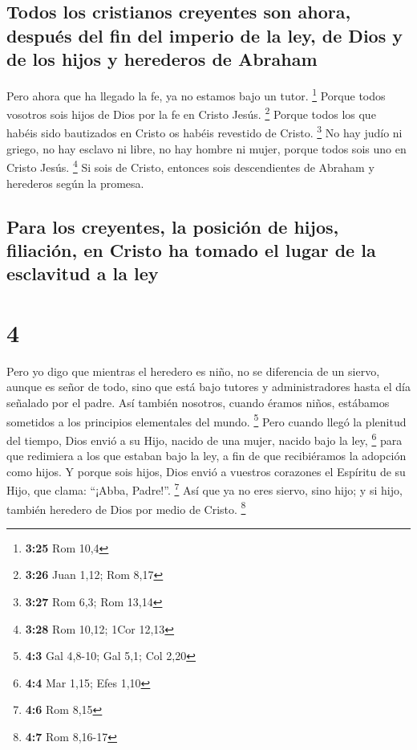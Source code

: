 \hypertarget{todos-los-cristianos-creyentes-son-ahora-despuuxe9s-del-fin-del-imperio-de-la-ley-de-dios-y-de-los-hijos-y-herederos-de-abraham}{%
\subsection{Todos los cristianos creyentes son ahora, después del fin
del imperio de la ley, de Dios y de los hijos y herederos de
Abraham}\label{todos-los-cristianos-creyentes-son-ahora-despuuxe9s-del-fin-del-imperio-de-la-ley-de-dios-y-de-los-hijos-y-herederos-de-abraham}}

 Pero ahora que ha llegado la fe, ya no estamos bajo un
tutor. \footnote{\textbf{3:25} Rom 10,4}  Porque todos
vosotros sois hijos de Dios por la fe en Cristo Jesús. \footnote{\textbf{3:26}
  Juan 1,12; Rom 8,17}  Porque todos los que habéis sido
bautizados en Cristo os habéis revestido de Cristo. \footnote{\textbf{3:27}
  Rom 6,3; Rom 13,14}  No hay judío ni griego, no hay
esclavo ni libre, no hay hombre ni mujer, porque todos sois uno en
Cristo Jesús. \footnote{\textbf{3:28} Rom 10,12; 1Cor 12,13}
 Si sois de Cristo, entonces sois descendientes de
Abraham y herederos según la promesa.

\hypertarget{para-los-creyentes-la-posiciuxf3n-de-hijos-filiaciuxf3n-en-cristo-ha-tomado-el-lugar-de-la-esclavitud-a-la-ley}{%
\subsection{Para los creyentes, la posición de hijos, filiación, en
Cristo ha tomado el lugar de la esclavitud a la
ley}\label{para-los-creyentes-la-posiciuxf3n-de-hijos-filiaciuxf3n-en-cristo-ha-tomado-el-lugar-de-la-esclavitud-a-la-ley}}

\hypertarget{section-3}{%
\section{4}\label{section-3}}

 Pero yo digo que mientras el heredero es niño, no se
diferencia de un siervo, aunque es señor de todo,  sino
que está bajo tutores y administradores hasta el día señalado por el
padre.  Así también nosotros, cuando éramos niños,
estábamos sometidos a los principios elementales del mundo. \footnote{\textbf{4:3}
  Gal 4,8-10; Gal 5,1; Col 2,20}  Pero cuando llegó la
plenitud del tiempo, Dios envió a su Hijo, nacido de una mujer, nacido
bajo la ley, \footnote{\textbf{4:4} Mar 1,15; Efes 1,10} 
para que redimiera a los que estaban bajo la ley, a fin de que
recibiéramos la adopción como hijos.  Y porque sois hijos,
Dios envió a vuestros corazones el Espíritu de su Hijo, que clama:
``¡Abba, Padre!''. \footnote{\textbf{4:6} Rom 8,15}  Así
que ya no eres siervo, sino hijo; y si hijo, también heredero de Dios
por medio de Cristo. \footnote{\textbf{4:7} Rom 8,16-17}

